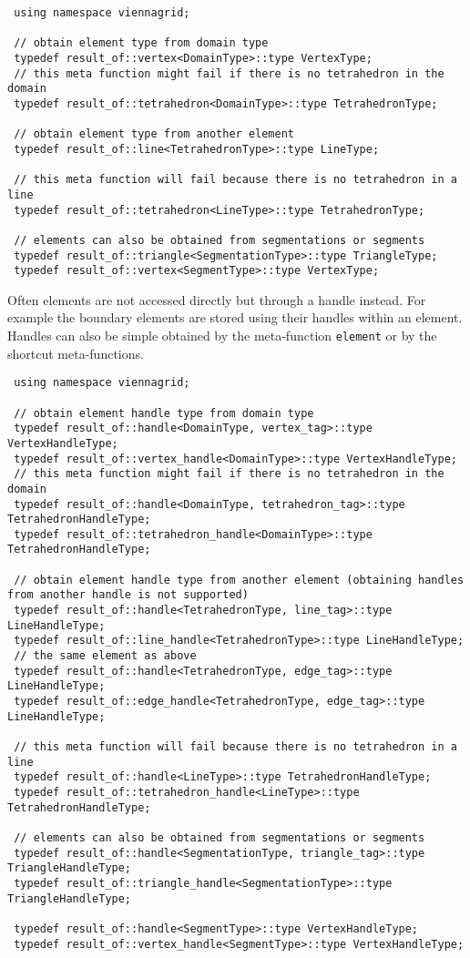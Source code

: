 \begin{lstlisting}
 using namespace viennagrid;
 
 // obtain element type from domain type
 typedef result_of::vertex<DomainType>::type VertexType;
 // this meta function might fail if there is no tetrahedron in the domain
 typedef result_of::tetrahedron<DomainType>::type TetrahedronType;
 
 // obtain element type from another element
 typedef result_of::line<TetrahedronType>::type LineType;
 
 // this meta function will fail because there is no tetrahedron in a line
 typedef result_of::tetrahedron<LineType>::type TetrahedronType;
 
 // elements can also be obtained from segmentations or segments
 typedef result_of::triangle<SegmentationType>::type TriangleType;
 typedef result_of::vertex<SegmentType>::type VertexType;
\end{lstlisting}

Often elements are not accessed directly but through a handle instead. For example the boundary elements are stored using their handles within an element. Handles can also be simple obtained by the meta-function \lstinline|element| or by the shortcut meta-functions.

\begin{lstlisting}
 using namespace viennagrid;
 
 // obtain element handle type from domain type
 typedef result_of::handle<DomainType, vertex_tag>::type VertexHandleType;
 typedef result_of::vertex_handle<DomainType>::type VertexHandleType;
 // this meta function might fail if there is no tetrahedron in the domain
 typedef result_of::handle<DomainType, tetrahedron_tag>::type TetrahedronHandleType;
 typedef result_of::tetrahedron_handle<DomainType>::type TetrahedronHandleType;
 
 // obtain element handle type from another element (obtaining handles from another handle is not supported)
 typedef result_of::handle<TetrahedronType, line_tag>::type LineHandleType;
 typedef result_of::line_handle<TetrahedronType>::type LineHandleType;
 // the same element as above
 typedef result_of::handle<TetrahedronType, edge_tag>::type LineHandleType;
 typedef result_of::edge_handle<TetrahedronType, edge_tag>::type LineHandleType;
 
 // this meta function will fail because there is no tetrahedron in a line
 typedef result_of::handle<LineType>::type TetrahedronHandleType;
 typedef result_of::tetrahedron_handle<LineType>::type TetrahedronHandleType;
 
 // elements can also be obtained from segmentations or segments
 typedef result_of::handle<SegmentationType, triangle_tag>::type TriangleHandleType;
 typedef result_of::triangle_handle<SegmentationType>::type TriangleHandleType;
 
 typedef result_of::handle<SegmentType>::type VertexHandleType;
 typedef result_of::vertex_handle<SegmentType>::type VertexHandleType;
\end{lstlisting}



